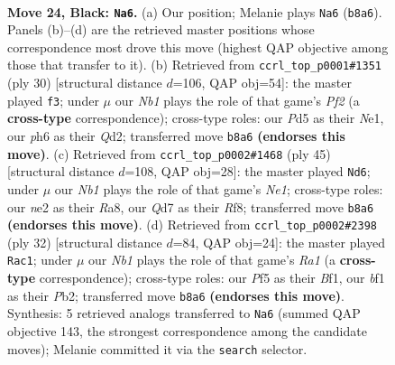 \documentclass[11pt]{article}
\begin{document}
\clearpage

\begin{figure}[p]\centering
\begin{subfigure}{0.46\textwidth}\centering
\resizebox{\linewidth}{!}{%
\newchessgame
\chessboard[
  setfen={rnr2k2/pb1qb2p/1pp3pP/3p1pP1/P2P1P2/1P2P3/4N3/R2QKBNR b KQ - 18 24},
  showmover=false,
  pgfstyle=straightmove, color=movearrow, markmove={b8-a6}
]}
\caption{}
\end{subfigure}\hfill
\begin{subfigure}{0.46\textwidth}\centering
\resizebox{\linewidth}{!}{%
\newchessgame
\chessboard[
  setfen={r1bk1q1r/pp1n1p2/3p1n1p/2pPp1p1/2P1P1P1/2PBB2P/P2Q1P2/2KRN2R w - - 0 16},
  showmover=false,
  pgfstyle=straightmove, color=movearrow, markmove={f2-f3}
]}
\caption{}
\end{subfigure}
\\[4pt]
\begin{subfigure}{0.46\textwidth}\centering
\resizebox{\linewidth}{!}{%
\newchessgame
\chessboard[
  setfen={r3nr1k/1ppbq2p/2p2pp1/p3p3/P3P1P1/1P1PPNNP/2P1QR2/6RK b - - 2 23},
  showmover=false,
  pgfstyle=straightmove, color=movearrow, markmove={e8-d6}
]}
\caption{}
\end{subfigure}\hfill
\begin{subfigure}{0.46\textwidth}\centering
\resizebox{\linewidth}{!}{%
\newchessgame
\chessboard[
  setfen={2rqr1k1/5pbp/2nppnp1/ppp5/4P3/P1PPBNPP/1P2QP2/R3RBK1 w - - 0 17},
  showmover=false,
  pgfstyle=straightmove, color=movearrow, markmove={a1-c1}
]}
\caption{}
\end{subfigure}
\caption{\textbf{Move 24, Black: \texttt{Na6}.} (a) Our position; Melanie plays \texttt{Na6} (\texttt{b8a6}). Panels (b)--(d) are the retrieved master positions whose correspondence most drove this move (highest QAP objective among those that transfer to it). (b) Retrieved from \texttt{ccrl\_top\_p0001\#1351} (ply 30) [structural distance $d$=106, QAP obj=54]: the master played \texttt{f3}; under $\mu$ our \emph{Nb1} plays the role of that game's \emph{Pf2} (a \textbf{cross-type} correspondence); cross-type roles: our \emph{P}d5 as their \emph{N}e1, our \emph{p}h6 as their \emph{Q}d2; transferred move \texttt{b8a6} \textbf{(endorses this move)}. (c) Retrieved from \texttt{ccrl\_top\_p0002\#1468} (ply 45) [structural distance $d$=108, QAP obj=28]: the master played \texttt{Nd6}; under $\mu$ our \emph{Nb1} plays the role of that game's \emph{Ne1}; cross-type roles: our \emph{n}e2 as their \emph{R}a8, our \emph{Q}d7 as their \emph{R}f8; transferred move \texttt{b8a6} \textbf{(endorses this move)}. (d) Retrieved from \texttt{ccrl\_top\_p0002\#2398} (ply 32) [structural distance $d$=84, QAP obj=24]: the master played \texttt{Rac1}; under $\mu$ our \emph{Nb1} plays the role of that game's \emph{Ra1} (a \textbf{cross-type} correspondence); cross-type roles: our \emph{P}f5 as their \emph{B}f1, our \emph{b}f1 as their \emph{P}b2; transferred move \texttt{b8a6} \textbf{(endorses this move)}. Synthesis: 5 retrieved analogs transferred to \texttt{Na6} (summed QAP objective 143, the strongest correspondence among the candidate moves); Melanie committed it via the \texttt{search} selector.}
\label{fig:thought-m47}
\end{figure}
\end{document}
